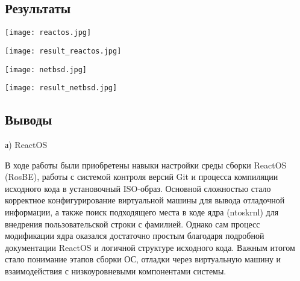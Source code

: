 \documentclass[a4paper, 14pt]{extarticle}
\begin{document}
\newpage


\vspace{1em}
\begin{center}
\section{Результаты}
\begin{minipage}{\linewidth}
\vspace{50pt}
\centering
\texttt{[image: reactos.jpg]}
\label{fig:reactos.jpg}


\end{minipage}
\begin{minipage}{\linewidth}
\vspace{50pt}
\centering
\texttt{[image: result\_reactos.jpg]}
\label{fig:result_reactos.jpg}
\end{minipage}

\begin{minipage}{\linewidth}
\vspace{50pt}
\centering
\texttt{[image: netbsd.jpg]}
\label{fig:netbsd.jpg}
\end{minipage}


\begin{minipage}{\linewidth}
\vspace{50pt}
\centering
\texttt{[image: result\_netbsd.jpg]}
\label{fig:result_netbsd.jpg}
\end{minipage}

\end{center}

\newpage

\begin{center}
\section{Выводы}
а) ReactOS
\end{center}
В ходе работы были приобретены навыки настройки среды сборки ReactOS (RosBE), работы с системой контроля версий Git и процесса компиляции исходного кода в установочный ISO-образ. Основной сложностью стало корректное конфигурирование виртуальной машины для вывода отладочной информации, а также поиск подходящего места в коде ядра (ntoskrnl) для внедрения пользовательской строки с фамилией. Однако сам процесс модификации ядра оказался достаточно простым благодаря подробной документации ReactOS и логичной структуре исходного кода. Важным итогом стало понимание этапов сборки ОС, отладки через виртуальную машину и взаимодействия с низкоуровневыми компонентами системы.
\end{document}
